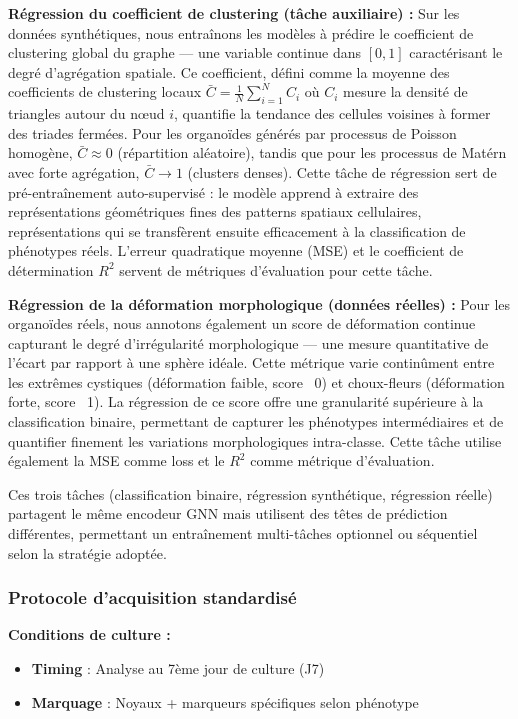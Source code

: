 \textbf{Régression du coefficient de clustering (tâche auxiliaire) :}
Sur les données synthétiques, nous entraînons les modèles à prédire le coefficient de clustering global du graphe — une variable continue dans $[0, 1]$ caractérisant le degré d'agrégation spatiale. Ce coefficient, défini comme la moyenne des coefficients de clustering locaux $\bar{C} = \frac{1}{N}\sum_{i=1}^N C_i$ où $C_i$ mesure la densité de triangles autour du nœud $i$, quantifie la tendance des cellules voisines à former des triades fermées. Pour les organoïdes générés par processus de Poisson homogène, $\bar{C} \approx 0$ (répartition aléatoire), tandis que pour les processus de Matérn avec forte agrégation, $\bar{C} \rightarrow 1$ (clusters denses). Cette tâche de régression sert de pré-entraînement auto-supervisé : le modèle apprend à extraire des représentations géométriques fines des patterns spatiaux cellulaires, représentations qui se transfèrent ensuite efficacement à la classification de phénotypes réels. L'erreur quadratique moyenne (MSE) et le coefficient de détermination $R^2$ servent de métriques d'évaluation pour cette tâche.

\textbf{Régression de la déformation morphologique (données réelles) :}
Pour les organoïdes réels, nous annotons également un score de déformation continue capturant le degré d'irrégularité morphologique — une mesure quantitative de l'écart par rapport à une sphère idéale. Cette métrique varie continûment entre les extrêmes cystiques (déformation faible, score ~0) et choux-fleurs (déformation forte, score ~1). La régression de ce score offre une granularité supérieure à la classification binaire, permettant de capturer les phénotypes intermédiaires et de quantifier finement les variations morphologiques intra-classe. Cette tâche utilise également la MSE comme loss et le $R^2$ comme métrique d'évaluation.

Ces trois tâches (classification binaire, régression synthétique, régression réelle) partagent le même encodeur GNN mais utilisent des têtes de prédiction différentes, permettant un entraînement multi-tâches optionnel ou séquentiel selon la stratégie adoptée.

\subsubsection{Protocole d'acquisition standardisé}

\textbf{Conditions de culture :}
\begin{itemize}
    \item \textbf{Timing} : Analyse au 7ème jour de culture (J7)
    \item \textbf{Marquage} : Noyaux + marqueurs spécifiques selon phénotype
\end{itemize}

